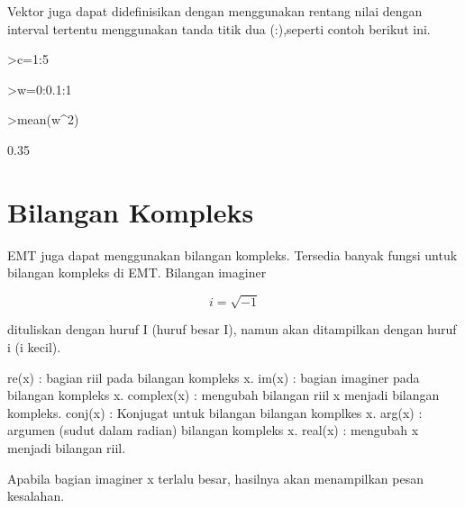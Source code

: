 \documentclass{article}
\newenvironment{eulernotebook}{\par}{\par}
\newcommand{\eulerheading}[1]{\section{#1}}
\newenvironment{eulercomment}{\par\medskip}{\par\medskip}
\newenvironment{eulerformula}{}{}
\begin{document}
\begin{eulernotebook}
\begin{eulercomment}
Vektor juga dapat didefinisikan dengan menggunakan rentang nilai dengan interval
tertentu menggunakan tanda titik dua (:),seperti contoh berikut ini.
\end{eulercomment}
\begin{eulerprompt}
>c=1:5
\end{eulerprompt}
\begin{euleroutput}
  [1,  2,  3,  4,  5]
\end{euleroutput}
\begin{eulerprompt}
>w=0:0.1:1
\end{eulerprompt}
\begin{euleroutput}
  [0,  0.1,  0.2,  0.3,  0.4,  0.5,  0.6,  0.7,  0.8,  0.9,  1]
\end{euleroutput}
\begin{eulerprompt}
>mean(w^2)
\end{eulerprompt}
\begin{euleroutput}
  0.35
\end{euleroutput}
\eulerheading{Bilangan Kompleks}
\begin{eulercomment}
EMT juga dapat menggunakan bilangan kompleks. Tersedia banyak fungsi untuk
bilangan kompleks di EMT. Bilangan imaginer

\end{eulercomment}
\begin{eulerformula}
\[
i = \sqrt{-1}
\]
\end{eulerformula}
\begin{eulercomment}
dituliskan dengan huruf I (huruf besar I), namun akan ditampilkan dengan huruf i
(i kecil).

\end{eulercomment}
\begin{eulerttcomment}
  re(x) : bagian riil pada bilangan kompleks x.
  im(x) : bagian imaginer pada bilangan kompleks x.
  complex(x) : mengubah bilangan riil x menjadi bilangan kompleks.
  conj(x) : Konjugat untuk bilangan bilangan komplkes x.
  arg(x) : argumen (sudut dalam radian) bilangan kompleks x.
  real(x) : mengubah x menjadi bilangan riil.
\end{eulerttcomment}
\begin{eulercomment}

Apabila bagian imaginer x terlalu besar, hasilnya akan menampilkan pesan
kesalahan.


\end{eulercomment}
\end{eulernotebook}
\end{document}
